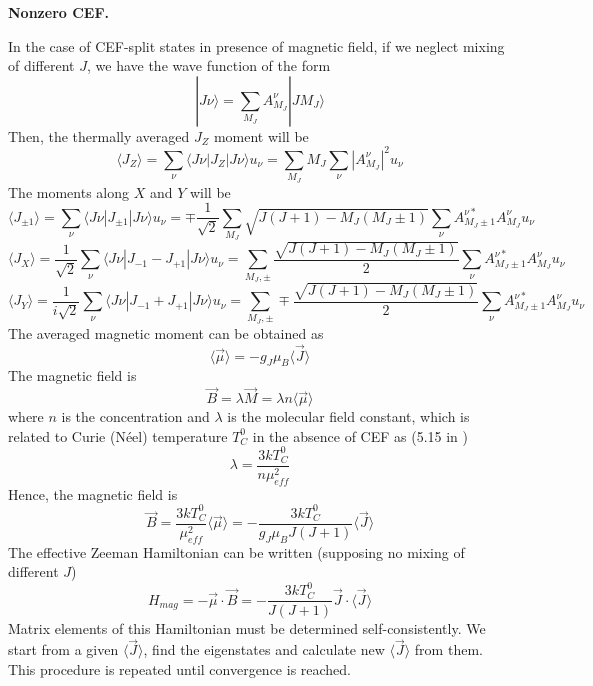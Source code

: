 \documentclass[a4paper,oneside,12pt]{extarticle}
\begin{document}
{\bf Nonzero CEF.}

In the case of CEF-split states in presence of magnetic field, if we neglect mixing of different $J$, we have the wave function of the form
$$
|J\nu \rangle = \sum_{M_J} A^{\nu}_{M_J} |JM_J\rangle
$$
%
Then, the thermally averaged $J_Z$ moment will be
%
\begin{equation}
	\langle J_Z \rangle = \sum_{\nu} \langle J\nu | J_Z |J\nu \rangle u_{\nu} = 
	\sum_{M_J} M_J \sum_{\nu} |A^{\nu}_{M_J}|^2 u_{\nu}
	\label{eq:JzMoment}
\end{equation}
%
The moments along $X$ and $Y$ will be 
\begin{equation}
	\langle J_{\pm 1} \rangle = \sum_{\nu} \langle J\nu | J_{\pm 1} |J\nu \rangle u_{\nu} = 
	\mp \frac{1}{\sqrt{2}} \sum_{M_J} \sqrt{J(J+1)-M_J(M_J\pm 1)}  \sum_{\nu} A^{\nu *}_{M_J\pm 1} A^{\nu}_{M_J} u_{\nu}
\end{equation}
%
\begin{equation}
	\langle J_X \rangle = \frac{1}{\sqrt{2}} \sum_{\nu} \langle J\nu | J_{-1} - J_{+1} |J\nu \rangle u_{\nu} = 
	\sum_{M_J,\pm} \frac{\sqrt{J(J+1)-M_J(M_J\pm 1)}}{2}  \sum_{\nu} A^{\nu *}_{M_J\pm 1} A^{\nu}_{M_J} u_{\nu}
\end{equation}
%
\begin{equation}
	\langle J_Y \rangle = \frac{1}{i\sqrt{2}} \sum_{\nu} \langle J\nu | J_{-1} + J_{+1} |J\nu \rangle u_{\nu} = 
	\sum_{M_J,\pm} \mp \frac{\sqrt{J(J+1)-M_J(M_J\pm 1)}}{2}  \sum_{\nu} A^{\nu *}_{M_J\pm 1} A^{\nu}_{M_J} u_{\nu}
\end{equation}
%
The averaged magnetic moment can be obtained as
$$
\langle \vec{\mu} \rangle = - g_{J} \mu_B \langle \vec{J} \rangle
$$
The magnetic field is
$$
\vec{B} = \lambda \vec{M} = \lambda n \langle \vec{\mu} \rangle
$$
where $n$ is the concentration and $\lambda$ is the molecular field constant, which is related to Curie (N\'eel) temperature $T_C^0$ in the absence of CEF as (5.15 in \cite{Getzlaff_2008})
$$
\lambda = \frac{3k T_C^0}{n \mu_{eff}^2}
$$
Hence, the magnetic field is
$$
\vec{B} = \frac{3k T_C^0}{\mu_{eff}^2} \langle \vec{\mu} \rangle =
- \frac{3k T_C^0}{g_J \mu_B J(J+1)} \langle \vec{J} \rangle
$$
The effective Zeeman Hamiltonian can be written (supposing no mixing of different $J$)
$$
H_{mag} = - \vec{\mu} \cdot \vec{B} = -\frac{3k T_C^0}{J(J+1)} \vec{J}\cdot\langle \vec{J} \rangle
$$
Matrix elements of this Hamiltonian must be determined self-consistently. We start from a given $\langle \vec{J} \rangle$, find the eigenstates and calculate new $\langle \vec{J} \rangle$ from them. This procedure is repeated until convergence is reached.
\end{document}

